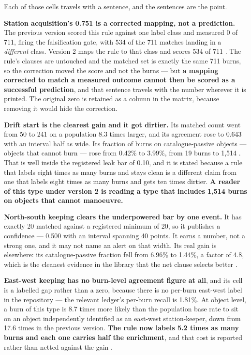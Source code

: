 \documentclass[11pt]{article}
\begin{document}

Each of those cells travels with a sentence, and the sentences are the point.

\textbf{Station acquisition's 0.751 is a corrected mapping, not a prediction.} The previous version scored this rule against one label class and measured 0 of 711, firing the falsification gate, with 534 of the 711 matches landing in a \emph{different} class. Version 2 maps the rule to that class and scores 534 of 711%
. The rule's clauses are untouched and the matched set is exactly the same 711 burns, so the correction moved the score and not the burns --- but \textbf{a mapping corrected to match a measured outcome cannot then be scored as a successful prediction}, and that sentence travels with the number wherever it is printed. The original zero is retained as a column in the matrix, because removing it would hide the correction.

\textbf{Drift start is the clearest gain and it got dirtier.} Its matched count went from 50 to 241 on a population 8.3 times larger, and its agreement rose to 0.643 with an interval half as wide. Its fraction of burns on catalogue-passive objects --- objects that cannot burn --- rose from 0.42\% to 3.99\%, from 19 burns to 1,514%
. That is well inside the registered leak bar of 0.10, and it is stated because a rule that labels eight times as many burns and stays clean is a different claim from one that labels eight times as many burns and gets ten times dirtier. \textbf{A reader of this type under version 2 is reading a type that includes 1,514 burns on objects that cannot manoeuvre.}

\textbf{North-south keeping clears the underpowered bar by one event.} It has exactly 20 matched against a registered minimum of 20, so it publishes a confidence --- 0.500 with an interval spanning 40 points. It earns a number, not a strong one, and it may not name an alert on that width. Its real gain is elsewhere: its catalogue-passive fraction fell from 6.96\% to 1.44\%, a factor of 4.8, which is the cleanest evidence in the library that the net clause selects better%
.

\textbf{East-west keeping has no burn-level agreement figure at all}, and its cell is a labelled gap rather than a zero, because there is no per-burn east-west label in the repository --- the relevant ledger's per-burn recall is 1.81\%. At object level, a burn of this type is 8.7 times more likely than the population base rate to sit on an object independently identified as an east-west station-keeper, down from 17.6 times in the previous version. \textbf{The rule now labels 5.2 times as many burns and each one carries half the enrichment}, and that cost is reported rather than netted against the gain%
.
\end{document}
